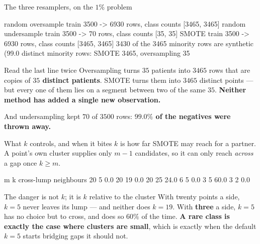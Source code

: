 \documentclass[aspectratio=169]{beamer}
\begin{document}
\begin{frame}[fragile,shrink=8]{The three resamplers, on the $1\%$ problem}
\begin{outblk}
   random oversample   train  3500 ->  6930 rows,  class counts [3465, 3465]
   random undersample  train  3500 ->    70 rows,  class counts [35, 35]
   SMOTE               train  3500 ->  6930 rows,  class counts [3465, 3465]
      3430 of the 3465 minority rows are synthetic (99.0%
      distinct minority rows: SMOTE 3465, oversampling 35
\end{outblk}
\begin{alertblock}{Read the last line twice}
  \footnotesize Oversampling turns $35$ patients into $3465$ rows that are
  copies of \textbf{$35$ distinct patients}. SMOTE turns them into $3465$
  distinct points --- but every one of them lies on a segment between two of
  the same $35$. \textbf{Neither method has added a single new observation.}
\end{alertblock}
\begin{center}\small
  And undersampling kept $70$ of $3500$ rows: \textbf{$99.0\%$ of the
  negatives were thrown away.}
\end{center}
\end{frame}

\begin{frame}[fragile,shrink=8]{What $k$ controls, and when it bites}
$k$ is how far SMOTE may reach for a partner. A point's own cluster supplies
only $m-1$ candidates, so it can only reach \emph{across} a gap once
$k \ge m$.
\begin{outblk}
     m        k cross-lump neighbours
    20        5                 0.0%
    20       19                 0.0%
    20       25                24.0%
     6        5                 0.0%
     3        5                60.0%
     3        2                 0.0%
\end{outblk}
\begin{alertblock}{The danger is not $k$; it is $k$ relative to the cluster}
  \footnotesize With twenty points a side, $k=5$ never leaves its lump ---
  and neither does $k=19$. With \textbf{three} a side, $k=5$ has no choice but
  to cross, and does so $60\%$ of the time. \textbf{A rare class is exactly
  the case where clusters are small}, which is exactly when the default
  $k=5$ starts bridging gaps it should not.
\end{alertblock}
\end{frame}
\end{document}
